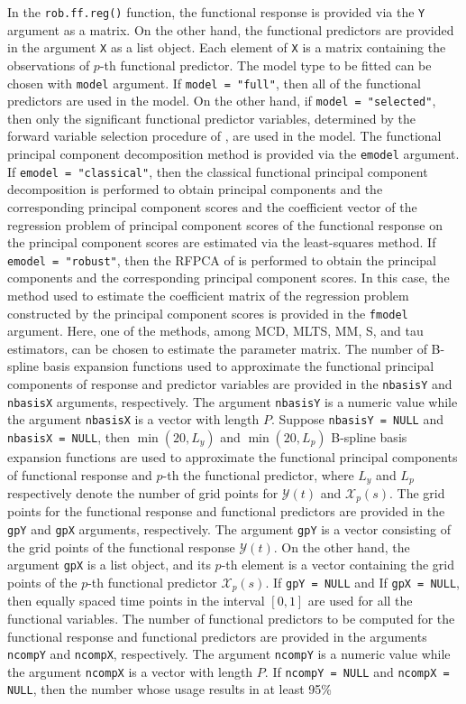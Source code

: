 In the \texttt{rob.ff.reg()} function, the functional response is provided via the \texttt{Y} argument as a matrix. On the other hand, the functional predictors are provided in the argument \texttt{X} as a list object. Each element of \texttt{X} is a matrix containing the observations of $p$-th functional predictor. The model type to be fitted can be chosen with \texttt{model} argument. If \texttt{model = "full"}, then all of the functional predictors are used in the model. On the other hand, if \texttt{model = "selected"}, then only the significant functional predictor variables, determined by the forward variable selection procedure of \cite{BS22}, are used in the model. The functional principal component decomposition method is provided via the \texttt{emodel} argument. If \texttt{emodel = "classical"}, then the classical functional principal component decomposition is performed to obtain principal components and the corresponding principal component scores and the coefficient vector of the regression problem of principal component scores of the functional response on the principal component scores are estimated via the least-squares method. If \texttt{emodel = "robust"}, then the RFPCA of \cite{Bali2011} is performed to obtain the principal components and the corresponding principal component scores. In this case, the method used to estimate the coefficient matrix of the regression problem constructed by the principal component scores is provided in the \texttt{fmodel} argument. Here, one of the methods, among MCD, MLTS, MM, S, and tau estimators, can be chosen to estimate the parameter matrix. The number of B-spline basis expansion functions used to approximate the functional principal components of response and predictor variables are provided in the \texttt{nbasisY} and \texttt{nbasisX} arguments, respectively. The argument \texttt{nbasisY} is a numeric value while the argument \texttt{nbasisX} is a vector with length $P$. Suppose \texttt{nbasisY = NULL} and \texttt{nbasisX = NULL}, then $\min(20, L_y)$ and $\min(20, L_p)$ B-spline basis expansion functions are used to approximate the functional principal components of functional response and $p$-th the functional predictor, where $L_y$ and $L_p$ respectively denote the number of grid points for $\mathcal{Y}(t)$ and $\mathcal{X}_p(s)$. The grid points for the functional response and functional predictors are provided in the \texttt{gpY} and \texttt{gpX} arguments, respectively. The argument \texttt{gpY} is a vector consisting of the grid points of the functional response $\mathcal{Y}(t)$. On the other hand, the argument \texttt{gpX} is a list object, and its $p$-th element is a vector containing the grid points of the $p$-th functional predictor $\mathcal{X}_p(s)$. If \texttt{gpY = NULL} and If \texttt{gpX = NULL}, then equally spaced time points in the interval $[0,1]$ are used for all the functional variables. The number of functional predictors to be computed for the functional response and functional predictors are provided in the arguments \texttt{ncompY} and \texttt{ncompX}, respectively. The argument \texttt{ncompY} is a numeric value while the argument \texttt{ncompX} is a vector with length $P$. If \texttt{ncompY = NULL} and \texttt{ncompX = NULL}, then the number whose usage results in at least 95\% 